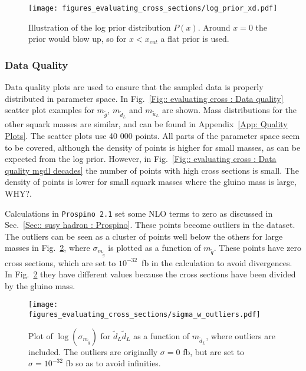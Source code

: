 \documentclass[twoside,english]{uiofysmaster}
\begin{document}
{\begin{figure}
\centering
\texttt{[image: figures\_evaluating\_cross\_sections/log\_prior\_xd.pdf]}
\caption{Illustration of the log prior distribution $P(x)$. Around $x=0$ the prior would blow up, so for $x < x_{cut}$ a flat prior is used.}
\label{Fig:: evaluating cross : prior illustration}
\end{figure}



\subsubsection{Data Quality}\label{Sec:: evaluating cross : Data Quality}


Data quality plots are used to ensure that the sampled data is properly distributed in parameter space. In Fig.~\ref{Fig:: evaluating cross : Data quality} scatter plot examples for $m_{\widetilde{g}}$, $m_{\widetilde{d}_L}$ and $m_{\widetilde{u}_L}$ are shown. Mass distributions for the other squark masses are similar, and can be found in Appendix~\ref{App: Quality Plots}. The scatter plots use 40 000 points. All parts of the parameter space seem to be covered, although the density of points is higher for small masses, as can be expected from the log prior. However, in Fig.~\ref{Fig:: evaluating cross : Data quality mgdl decades} the number of points with high cross sections is small. The density of points is lower for small squark masses where the gluino mass is large, WHY?. 

Calculations in \verb|Prospino 2.1| set some NLO terms to zero as discussed in Sec.~\ref{Sec:: susy hadron : Prospino}. These points become outliers in the dataset. The outliers can be seen as a cluster of points well below the others for large masses in Fig.~\ref{Fig:: evaluating cross : sigma w outliers}, where $\sigma_{m_{\widetilde{g}}}$ is plotted as a function of $m_{\tilde{q}}$. These points have zero cross sections, which are set to $10^{-32}$~fb in the calculation to avoid divergences. In Fig.~\ref{Fig:: evaluating cross : sigma w outliers} they have different values because the cross sections have been divided by the gluino mass.

\begin{figure}
\centering
\texttt{[image: figures\_evaluating\_cross\_sections/sigma\_w\_outliers.pdf]}
\caption{Plot of $\log( \sigma_{m_{\widetilde{g}}})$ for $\widetilde{d}_L \widetilde{d}_L$ as a function of $m_{\widetilde{d}_L}$, where outliers are included. The outliers are originally $\sigma=0$ fb, but are set to $\sigma =10^{-32}$ fb so as to avoid infinities.}
\label{Fig:: evaluating cross : sigma w outliers}
\end{figure}

}
\end{document}
